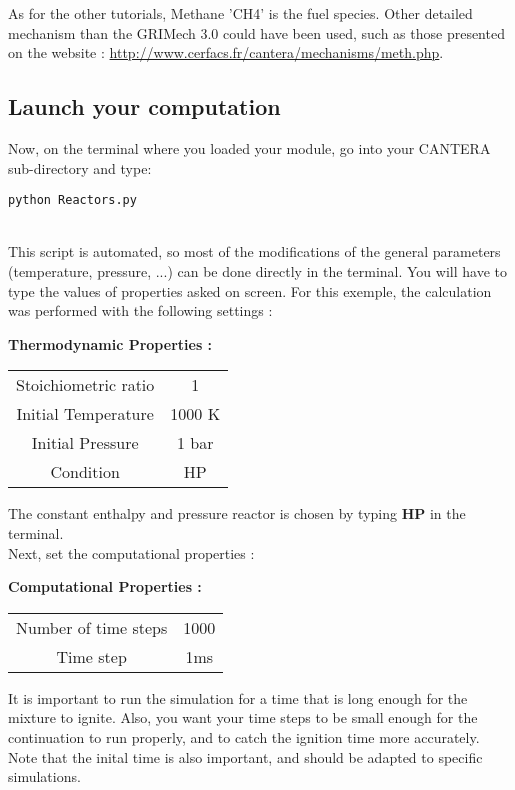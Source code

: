\documentclass[a4paper,11pt]{article}
\begin{document}
As for the other tutorials, Methane 'CH4' is the fuel species. Other detailed mechanism than the GRIMech 3.0 could have been used, such as those presented on the website : \url{http://www.cerfacs.fr/cantera/mechanisms/meth.php}.

\subsection{Launch your computation}
Now, on the terminal where you loaded your module, go into your CANTERA sub-directory and type: 
\begin{verbatim}
python Reactors.py 
\end{verbatim}
\\

This script is automated, so most of the modifications of the general parameters (temperature, pressure, ...) can be done directly in the terminal. You will have to type the values of properties asked on screen. For this exemple, the calculation was performed with the following settings : 
\bigskip

\begin{center}
\textbf{Thermodynamic Properties :} \\
\begin{tabular}{ c c }
  \hline 
  \hline
  Stoichiometric ratio & 1 \\
  Initial Temperature & 1000 K \\
  Initial Pressure & 1 bar \\ 
  Condition & HP \\
  \hline 
  \hline
\end{tabular}
\end{center}
\bigskip

The constant enthalpy and pressure reactor is chosen by typing \textbf{HP} in the terminal. \\

Next, set the computational properties : 
\bigskip 

\begin{center}
\textbf{Computational Properties :} \\
\begin{tabular}{ c c }
  \hline 
  \hline
  Number of time steps & 1000 \\
  Time step & 1ms \\
  \hline 
  \hline
\end{tabular}
\end{center}
\bigskip

It is important to run the simulation for a time that is long enough for the mixture to ignite. Also, you want your time steps to be small enough for the continuation to run properly, and to catch the ignition time more accurately. Note that the inital time is also important, and should be adapted to specific simulations.\\
\end{document}
